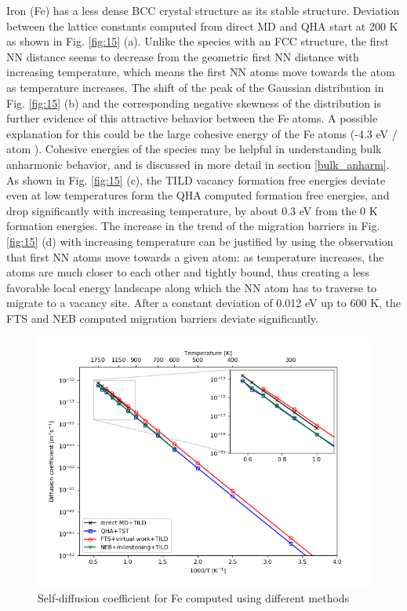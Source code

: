 \documentclass{article}
\begin{document}
Iron (Fe) has a less dense BCC crystal structure as its stable structure. Deviation between the lattice constants computed from direct MD and QHA start at 200 K as shown in Fig. \ref{fig:15} (a). Unlike the species with an FCC structure, the first NN distance seems to decrease from the geometric first NN distance with increasing temperature, which means the first NN atoms move towards the atom as temperature increases. The shift of the peak of the Gaussian distribution in Fig. \ref{fig:15} (b) and the corresponding negative skewness of the distribution is further evidence of this attractive behavior between the Fe atoms. A possible explanation for this could be the large cohesive energy of the Fe atoms (-4.3 eV / atom \cite{Ackland1997}). Cohesive energies of the species may be helpful in understanding bulk anharmonic behavior, and is discussed in more detail in section \ref{bulk_anharm}. As shown in Fig. \ref{fig:15} (c), the TILD vacancy formation free energies deviate even at low temperatures form the QHA computed formation free energies, and drop significantly with increasing temperature, by about 0.3 eV from the 0 K formation energies. The increase in the trend of the migration barriers  in Fig. \ref{fig:15} (d) with increasing temperature can be justified by using the observation that first NN atoms move towards a given atom: as temperature increases, the atoms are much closer to each other and tightly bound, thus creating a less favorable local energy landscape along which the NN atom has to traverse to migrate to a vacancy site. After a constant deviation of 0.012 eV up to 600 K, the FTS and NEB computed migration barriers deviate significantly.

\begin{figure}[htp]
\centering
\includegraphics[scale=0.65]{fe_self_diffusion}
\caption{Self-diffusion coefficient for Fe computed using different methods}
\label{fig:16}
\end{figure}
\end{document}
